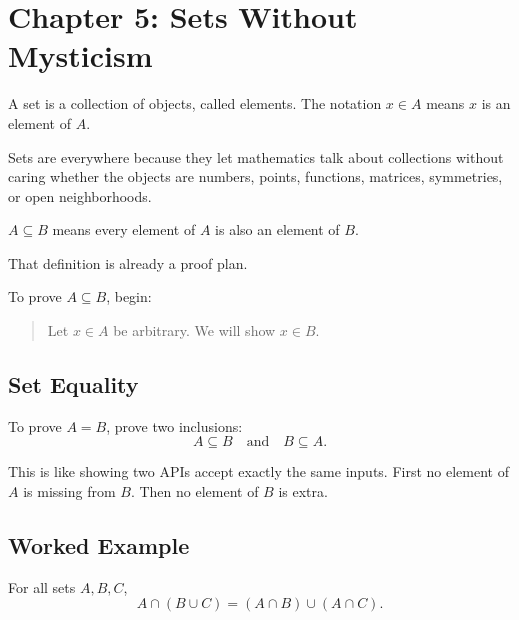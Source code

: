 \documentclass[11pt]{article}
\begin{document}
\section{Chapter 5: Sets Without Mysticism}

A set is a collection of objects, called elements. The notation $x\in A$ means $x$ is an element of $A$.

Sets are everywhere because they let mathematics talk about collections without caring whether the objects are numbers, points, functions, matrices, symmetries, or open neighborhoods.

\begin{definition}
$A\subseteq B$ means every element of $A$ is also an element of $B$.
\end{definition}

That definition is already a proof plan.

To prove $A\subseteq B$, begin:

\begin{quote}
Let $x\in A$ be arbitrary. We will show $x\in B$.
\end{quote}

\subsection{Set Equality}

To prove $A=B$, prove two inclusions:
\[
A\subseteq B \quad \text{and} \quad B\subseteq A.
\]

This is like showing two APIs accept exactly the same inputs. First no element of $A$ is missing from $B$. Then no element of $B$ is extra.

\subsection{Worked Example}

\begin{theorem}
For all sets $A,B,C$,
\[
A\cap(B\cup C)=(A\cap B)\cup(A\cap C).
\]
\end{theorem}
\end{document}
